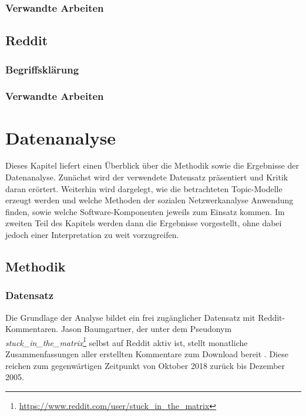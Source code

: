 \documentclass[11pt,a4paper,twoside]{article}
\let\rmarkdownfootnote\footnote%
\def\footnote{\protect\rmarkdownfootnote}
\begin{document}
\hypertarget{verwandte-arbeiten-1}{%
\subsubsection{Verwandte Arbeiten}\label{verwandte-arbeiten-1}}

\hypertarget{reddit}{%
\subsection{Reddit}\label{reddit}}

\hypertarget{begriffsklarung}{%
\subsubsection{Begriffsklärung}\label{begriffsklarung}}

\hypertarget{verwandte-arbeiten-2}{%
\subsubsection{Verwandte Arbeiten}\label{verwandte-arbeiten-2}}

\cleardoublepage

\hypertarget{datenanalyse}{%
\section{Datenanalyse}\label{datenanalyse}}

Dieses Kapitel liefert einen Überblick über die Methodik sowie die
Ergebnisse der Datenanalyse. Zunächst wird der verwendete Datensatz
präsentiert und Kritik daran erörtert. Weiterhin wird dargelegt, wie die
betrachteten Topic-Modelle erzeugt werden und welche Methoden der
sozialen Netzwerkanalyse Anwendung finden, sowie welche
Software-Komponenten jeweils zum Einsatz kommen. Im zweiten Teil des
Kapitels werden dann die Ergebnisse vorgestellt, ohne dabei jedoch einer
Interpretation zu weit vorzugreifen.

\hypertarget{methodik}{%
\subsection{Methodik}\label{methodik}}

\hypertarget{datensatz}{%
\subsubsection{Datensatz}\label{datensatz}}

Die Grundlage der Analyse bildet ein frei zugänglicher Datensatz mit
Reddit-Kommentaren. Jason Baumgartner, der unter dem Pseudonym
\emph{stuck\_in\_the\_matrix}\footnote{\url{https://www.reddit.com/user/stuck_in_the_matrix}}
selbst auf Reddit aktiv ist, stellt monatliche Zusammenfassungen aller
erstellten Kommentare zum Download bereit \autocite{Baumgartner}. Diese
reichen zum gegenwärtigen Zeitpunkt von Oktober 2018 zurück bis Dezember
2005.
\end{document}
